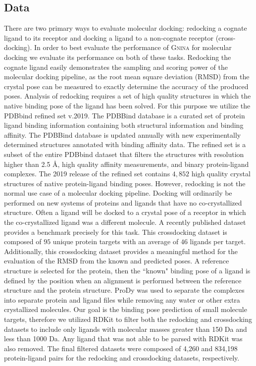 \documentclass[journal=jcisd8,manuscript=article]{achemso}
\begin{document}
\subsection{Data}
There are two primary ways to evaluate molecular docking: redocking a cognate ligand to its receptor and docking a ligand to a non-cognate receptor (cross-docking). In order to best evaluate the performance of \textsc{Gnina} for molecular docking we evaluate its performance on both of these tasks. Redocking the cognate ligand easily demonstrates the sampling and scoring power of the molecular docking pipeline, as the root mean square deviation (RMSD) from the crystal pose can be measured to exactly determine the accuracy of the produced poses. Analysis of redocking requires a set of high quality structures in which the native binding pose of the ligand has been solved. For this purpose we utilize the PDBbind refined set v.2019\cite{liu2017forging}. The PDBBind database is a curated set of protein ligand binding information containing both structural information and binding affinity. The PDBBind database is updated annually with new experimentally determined structures annotated with binding affinity data. The refined set is a subset of the entire PDBbind dataset that filters the structures with resolution higher than 2.5 \AA, high quality affinity measurements, and binary protein-ligand complexes. The 2019 release of the refined set contains $4,852$ high quality crystal structures of native protein-ligand binding poses. However, redocking is not the normal use case of a molecular docking pipeline. Docking will ordinarily be performed on new systems of proteins and ligands that have no co-crystallized structure. Often a ligand will be docked to a crystal pose of a receptor in which the co-crystallized ligand was a different molecule. A recently published dataset provides a benchmark precisely for this task\cite{wierbowski2020cross}. This crossdocking dataset is composed of $95$ unique protein targets with an average of $46$ ligands per target. Additionally, this crossdocking dataset provides a meaningful method for the evaluation of the RMSD from the known and predicted poses. A reference structure is selected for the protein, then the ``known" binding pose of a ligand is defined by the position when an alignment is performed between the reference structure and the protein structure. ProDy\cite{bakan2011prody} was used to separate the complexes into separate protein and ligand files while removing any water or other extra crystallized molecules. Our goal is the binding pose prediction of small molecule targets, therefore we utilized RDKit\cite{rdkit} to filter both the redocking and crossdocking datasets to include only ligands with molecular masses greater than 150 Da and less than 1000 Da. Any ligand that was not able to be parsed with RDKit was also removed. The final filtered datasets were composed of 4,260 and 834,198 protein-ligand pairs for the redocking and crossdocking datasets, respectively.
\end{document}
